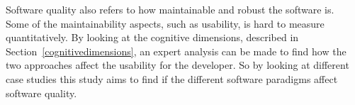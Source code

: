 Software quality also refers to how maintainable and robust the software
is.~\cite{Pressman:2004:SEP:994110} Some of the maintainability aspects, such as
usability, is hard to measure quantitatively. By looking at the cognitive
dimensions, described in Section~\ref{cognitivedimensions}, an expert analysis
can be made to find how the two approaches affect the usability for the
developer. So by looking at different case studies this study aims to find if
the different software paradigms affect software quality. 

